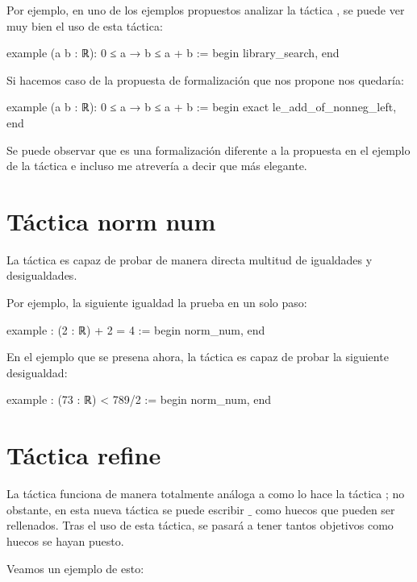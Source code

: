 Por ejemplo, en uno de los ejemplos propuestos analizar la táctica
, se puede ver muy bien el uso de esta
táctica:

\begin{leancode}
example (a b : ℝ): 0 ≤ a → b ≤ a + b :=
begin
  library_search,
end
\end{leancode}

Si hacemos caso de la propuesta de formalización que nos propone nos
quedaría:

\begin{leancode}
example (a b : ℝ): 0 ≤ a → b ≤ a + b :=
begin
  exact le_add_of_nonneg_left,
end
\end{leancode}

Se puede observar que es una formalización diferente a la propuesta en
el ejemplo de la táctica  e incluso me
atrevería a decir que más elegante.

\section{Táctica norm num}

La táctica  es capaz de probar de manera
directa multitud de igualdades y desigualdades.

Por ejemplo, la siguiente igualdad la prueba en un solo paso:

\begin{leancode}
example : (2 : ℝ) + 2 = 4 :=
begin
  norm_num,
end
\end{leancode}

En el ejemplo que se presena ahora, la táctica
 es capaz de probar la siguiente
desigualdad:
\begin{leancode}
example : (73 : ℝ) < 789/2 :=
begin
  norm_num,
end
\end{leancode}

\section{Táctica refine}

La táctica  funciona de manera totalmente
análoga a como lo hace la táctica ; no obstante,
en esta nueva táctica se puede escribir \(\_\) como huecos que pueden
ser rellenados. Tras el uso de esta táctica, se pasará a tener tantos
objetivos como huecos se hayan puesto.

Veamos un ejemplo de esto:

